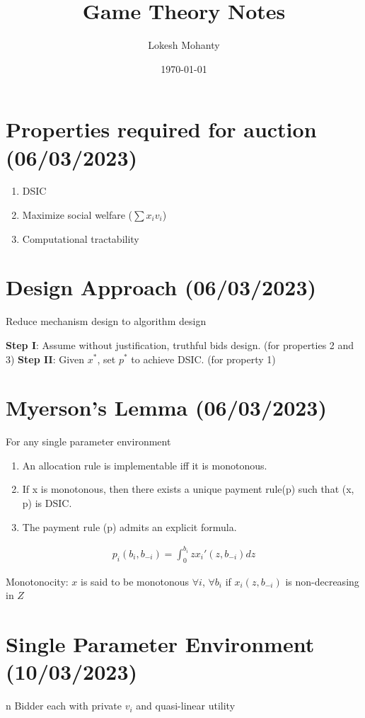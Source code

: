 \documentclass[11pt]{article}
\author{Lokesh Mohanty}
\date{\today}
\title{Game Theory Notes}
\begin{document}
\maketitle
\tableofcontents


\section{Properties required for auction (06/03/2023)}
\label{sec:orga2b49cf}
\begin{enumerate}
\item DSIC
\item Maximize social welfare (\(\sum x_i v_i\))
\item Computational tractability
\end{enumerate}

\section{Design Approach (06/03/2023)}
\label{sec:orgaf18c2d}
Reduce mechanism design to algorithm design

\textbf{Step  I}: Assume without justification, truthful bids design. (for properties 2 and 3)
\textbf{Step II}: Given \(x^{*}\), set \(p^{*}\) to achieve DSIC. (for property 1)

\section{Myerson's Lemma (06/03/2023)}
\label{sec:orge37cfb1}
For any single parameter environment
\begin{enumerate}
\item An allocation rule is implementable iff it is monotonous.
\item If x is monotonous, then there exists a unique payment rule(p) such that (x, p) is DSIC.
\item The payment rule (p) admits an explicit formula.
\end{enumerate}

\begin{align*}
p_i(b_i, b_{-i}) = \int_0^{b_i} z x_i' (z, b_{-i}) dz
\end{align*}

Monotonocity:
\(x\) is said to be monotonous \(\forall i\), \(\forall b_i\) if \(x_i(z, b_{-i})\) is non-decreasing in \(Z\)

\section{Single Parameter Environment (10/03/2023)}
\label{sec:orgf0f8b80}
n Bidder each with private \(v_i\) and quasi-linear utility
\end{document}
